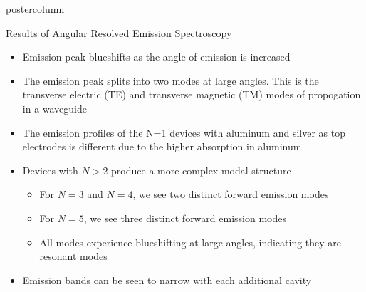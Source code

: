 \documentclass[10pt,papersize={24in,36in}]{beamer}
\begin{document}
\begin{frame}
\begin{columns}
\begin{column}{.49\textwidth}
\begin{beamercolorbox}[center,wd=\textwidth]{postercolumn}
\begin{minipage}[T]{.95\textwidth}
{			\vspace{1cm}
            \begin{block}{Results of Angular Resolved Emission Spectroscopy}
                \begin{minipage}{0.35\textwidth}
                    \begin{itemize}
                     \item Emission peak blueshifts as the angle of emission is increased
                     \item The emission peak splits into two modes at large angles. This is the transverse electric (TE) and transverse magnetic (TM) modes of propogation in a waveguide \cite{Stavrinou1999}
                     \item The emission profiles of the N=1 devices with aluminum and silver as top electrodes is different due to the higher absorption in aluminum \cite{Schulz1954}
                     \item Devices with $N>2$ produce a more complex modal structure
                     \begin{itemize}
                        \item For $N=3$ and $N=4$, we see two distinct forward emission modes
                        \item For $N=5$, we see three distinct forward emission modes
                        \item All modes experience blueshifting at large angles, indicating they are resonant modes \cite{Stavrinou1999}
                     \end{itemize}
                     \item Emission bands can be seen to narrow with each additional cavity
                    \end{itemize}
                \end{minipage}
                \begin{minipage}{0.55\textwidth}
                    \centering

\end{minipage}
\end{block}}
\end{minipage}
\end{beamercolorbox}
\end{column}
\end{columns}
\end{frame}
\end{document}
